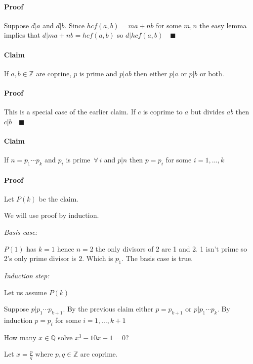 \documentclass{article}
\newcommand{\bb}[1]{\mathbb{#1}}
\newcommand{\A}{\,\forall\,}
\begin{document}
\paragraph{Proof} Suppose \(d|a\) and \(d|b\). Since \(hcf(a,b) = ma+nb\) for some \(m,n\) the easy lemma implies that \(d|ma+nb=hcf(a,b)\) so \(d|hcf(a,b)\quad\blacksquare\)

\paragraph{Claim} If \(a,b\in\bb Z\) are coprine, \(p\) is prime and \(p|ab\) then either \(p|a\) or \(p|b\)  or both.

\paragraph{Proof} This is a special case of the earlier claim. If \(c\) is coprime to \(a\) but divides \(ab\) then \(c|b\quad\blacksquare\)

\paragraph{Claim} If \(n=p_1\dotsm p_k\) and \(p_i\) is prime \(\A i\) and \(p|n\) then \(p=p_i\) for some \(i=1,\dotsc ,k\)

\paragraph{Proof} Let \(P(k)\) be the claim.

We will use proof by induction.

\emph{Basis case:}

\(P(1)\) has \(k=1\) hence \(n=2\) the only divisors of 2 are 1 and 2. 1 isn't prime so 2's only prime divisor is 2. Which is \(p_1\). The basis case is true.

\emph{Induction step:}

Let us assume \(P(k)\)

Suppose \(p|p_1\dotsm p_{k+1}\). By the previous claim either \(p=p_{k+1}\) or \(p|p_1\dotsm p_k\). By induction \(p=p_i\) for some \(i=1,\dotsc ,k+1\)

How many \(x\in\bb Q\) solve \(x^3-10x+1=0\)?

Let \(x=\frac pq\) where \(p,q\in\bb Z\) are coprime.
\end{document}

